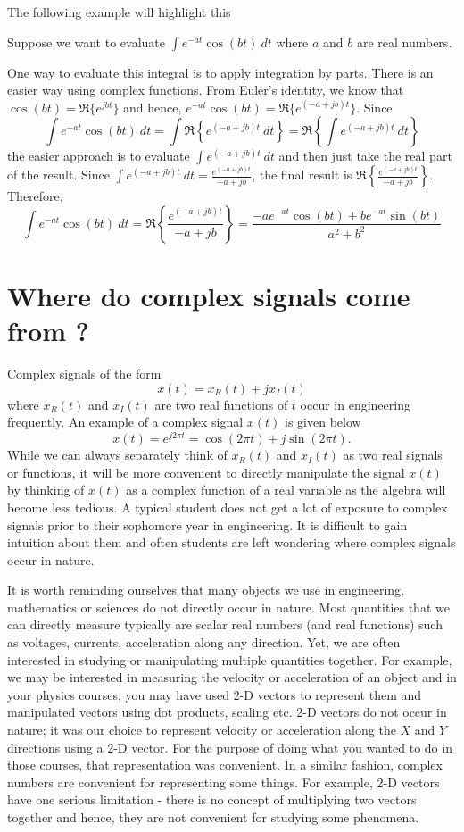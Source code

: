 The following example will highlight this
\begin{example}
Suppose we want to evaluate $\int e^{-at} \cos(bt) \ dt $ where $a$ and $b$ are real numbers.

One way to evaluate this integral is to apply integration by parts. There is an easier way using complex functions.
From Euler's identity, we know that $\cos(bt) = \Re\{e^{jbt}\}$ and hence, $e^{-at} \cos(bt) = \Re\{ e^{(-a+jb)t}\}$.
Since
\[
\int e^{-at} \cos(bt) \ dt  = \displaystyle{\int \Re \left\{ e^{(-a+jb)t} \ dt \right\} = \Re \left\{ \int e^{(-a+jb)t} \ dt \right\}}
\]
the easier approach is to evaluate $\int e^{(-a+jb)t} \ dt $ and then just take the real part of the result.
Since $\int e^{(-a+jb)t} \ dt = \frac{e^{(-a+jb)t}}{-a+jb}$, the final result is $\Re \left\{ \frac{e^{(-a+jb)t}}{-a+jb} \right\}$.
Therefore,
\[
\int e^{-at} \cos(bt) \ dt = \Re \left\{ \frac{e^{(-a+jb)t}}{-a+jb} \right\} = \frac{-a e^{-at} \cos (bt) + b e^{-at} \sin(bt)}{a^2+b^2}
\]
\end{example}

\section{Where do complex signals come from ?}
Complex signals of the form
\[
x(t) = x_R(t) + j x_I(t)
\]
where $x_R(t)$ and $x_I(t)$ are two real functions of $t$ occur in engineering frequently.
An example of a complex signal $x(t)$ is given below
\[
x(t) = e^{j 2 \pi t} = \cos(2 \pi t) + j \sin(2 \pi t).
\]
While we can always separately think of $x_R(t)$ and $x_I(t)$ as two real signals or functions, it will be more convenient
to directly manipulate the signal $x(t)$ by thinking of $x(t)$ as a complex function of a real variable as the algebra will become less tedious.
A typical student does not get a lot of exposure to complex signals prior to their sophomore year in engineering. It is difficult to gain intuition about them and often students are left wondering where complex signals occur in nature.

It is worth reminding ourselves that many objects we use in engineering, mathematics or sciences do not directly occur in nature.
Most quantities that we can directly measure typically are scalar real numbers (and real functions) such as voltages, currents, acceleration along any direction.
Yet, we are often interested in studying or manipulating multiple quantities together.
For example, we may be interested in measuring the velocity or acceleration of an object and in your physics courses,
you may have used 2-D vectors to represent them and manipulated vectors using dot products, scaling etc.
2-D vectors do not occur in nature;
it was our choice to represent velocity or acceleration along the $X$ and $Y$ directions using a 2-D vector.
For the purpose of doing what you wanted to do in those courses, that representation was convenient.
In a similar fashion, complex numbers are convenient for representing some things.
For example, 2-D vectors have one serious limitation - there is no concept of multiplying two vectors together and hence, they are not convenient for studying some phenomena.

